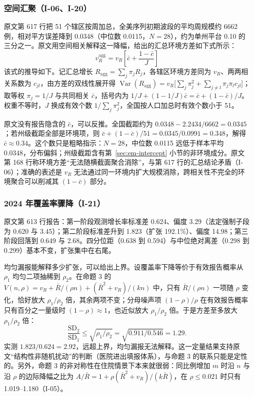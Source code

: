 \subsubsection{空间汇聚（I-06、I-20）}

原文第 617 行把 51 个辖区按周加总，全美序列初期波段的平均周规模约 6662 例，相对平方误差降到 0.0348（中位数 0.0115，$N=28$），约为单州平台 0.10 的三分之一。原文用空间相关解释这一降幅，给出的汇总环境方差如下式所示：
\begin{equation*}
v_R^{\mathrm{agg}} = v_R \left[\bar{c} + \frac{1-\bar{c}}{J}\right]
\tag*{原文第 617 行}
\end{equation*}
该式的推导如下。记汇总增长 $R_{\mathrm{agg}}=\sum_j\pi_jR_j$，各辖区环境方差同为 $v_R$、两两相关系数为 $c_{jl}$，由方差的双线性展开得 $\operatorname{Var}(R_{\mathrm{agg}})=v_R\big[\sum_j\pi_j^2+\sum_{j\ne l}\pi_j\pi_lc_{jl}\big]$；取等权 $\pi_j=1/J$ 与共同相关 $\bar c$，括号内为 $1/J+(1-1/J)\bar c=\bar c+(1-\bar c)/J$。权重不等时，$J$ 换成有效个数 $1/\sum_j\pi_j^2$，全国按人口加总时有效个数小于 51。

原文没有报告隐含的 $\bar c$，可以反推。全国截距约为 $0.0348-2.2434/6662=0.0345$；若州级截距全部是环境项，则 $\bar c+(1-\bar c)/51=0.0345/0.0991=0.348$，解得 $\bar c\approx0.34$。这个数只是粗略指示：$N=28$，中位数 0.0115 远低于样本平均 0.0348，分布偏斜；州级截距含有第~\ref{sec:em-intercept} 小节的非环境成分。原文第 168 行称环境方差“无法随横截面聚合消除”，与第 617 行的汇总结论矛盾（I-06）；准确的表述是 $v_R$ 无法通过同一环境内扩大规模消除，跨相关性不完全的环境聚合可以削减其 $(1-\bar c)$ 部分。

\subsubsection{2024 年覆盖率骤降（I-21）}

原文第 613 行报告：第一阶段观测增长率标准差 0.624、偏度 3.29（法定强制子段为 0.620 与 3.45）；第二阶段标准差升到 1.823（扩张 192.1\%）、偏度 14.98；第三阶段回落到 0.649 与 2.68。四分位距（0.638 到 0.594）与中位绝对离差（0.298 到 0.299）基本不变，扩张集中在右尾。

均匀漏报能解释多少扩张，可以给出上界。设覆盖率下降等价于有效报告概率从 $\rho_1$ 均匀二项抽稀到 $\rho_2$。在命题 3 的 $V(n,\rho)=v_R+\bar R/(\rho n)+(\bar R^2+v_R)/(kn)$ 中，只有 $\bar R/(\rho n)$ 一项随 $\rho$ 变化，恰好放大 $\rho_1/\rho_2$ 倍，其余两项不变；分母噪声项 $(1-\rho)/\rho$ 在有效报告概率只有百分之一量级时 $(1-\rho)\approx1$，也近似放大 $\rho_1/\rho_2$ 倍。于是方差至多放大 $\rho_1/\rho_2$ 倍：
\begin{equation*}
\frac{\mathrm{SD}_2}{\mathrm{SD}_1}\le\sqrt{\rho_1/\rho_2}=\sqrt{0.911/0.546}=1.29 .
\end{equation*}
实测 $1.823/0.624=2.92$，远超上界，均匀漏报无法解释。这一定量结果支持原文“结构性非随机扰动”的判断（医院进出填报体系），与命题 3 的联系只能是定性的。另外，命题 3 的非对称性在住院情景下本来就很弱：同比例增加 $m$ 时沿 $n$ 与沿 $\rho$ 的边际降幅之比为 $A/\bar R=1+\rho(\bar R^2+v_R)/(k\bar R)$，在 $\rho\le0.021$ 时只有 1.019--1.180（I-05）。

